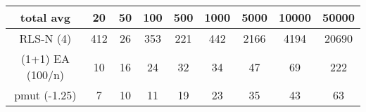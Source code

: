 \begin{tabular}[h]{ccccccccc}
total avg&20&50&100&500&1000&5000&10000&50000\\\hline
RLS-N (4)&412&26&353&221&442&2166&4194&20690\\
(1+1) EA (100/n)&10&16&24&32&34&47&69&222\\
pmut (-1.25)&7&10&11&19&23&35&43&63\\
\end{tabular}

